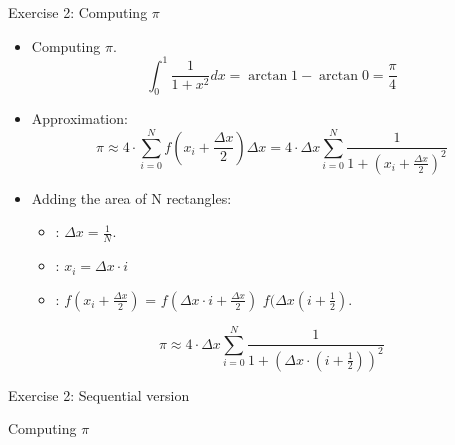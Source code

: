 \begin{frame}[t,shrink=20]{Exercise 2: Computing $\pi$}
\begin{itemize}

  \item Computing $\pi$.
\[
\int_{0}^{1} \frac{1}{1+x^2} dx =
\arctan{1} - \arctan{0} =
\frac{\pi}{4}
\]

  \item Approximation:
\[
\pi \approx 4 \cdot \sum_{i=0}^{N} f(x_{i} + \frac{\Delta x}{2}) \Delta x =
4 \cdot \Delta x \sum_{i=0}^{N} \frac{1}{1 + (x_i + \frac{\Delta x}{2} )^2}
\]

  \item Adding the area of N rectangles:
    \begin{itemize}
      \item {}: $\Delta x = \frac{1}{N}$.
      \item {}: $x_i = \Delta x \cdot i$
      \item {}: $f(x_i + \frac{\Delta x}{2})$ = $f(\Delta x \cdot i + \frac{\Delta x}{2})$
            $f(\Delta x (i + \frac{1}{2})$.
  \end{itemize}

\[
\pi \approx 
4 \cdot \Delta x \sum_{i=0}^{N} \frac{1}{1 + (\Delta x \cdot (i + \frac{1}{2} ))^2}
\]

\end{itemize}
\end{frame}

\begin{frame}[t]{Exercise 2: Sequential version}
\begin{block}{Computing $\pi$}

\end{block}
\end{frame}


